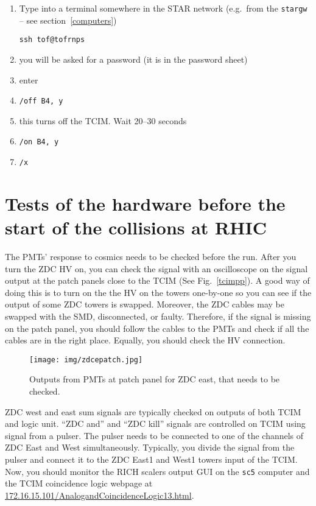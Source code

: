 \begin{enumerate}
\item Type into a terminal somewhere in the STAR network (e.g.\ from the \texttt{stargw} -- see section~\ref{computers})
\begin{verbatim}
ssh tof@tofrnps
\end{verbatim}
\item you will be asked for a password (it is in the password sheet)
\item enter
\item \verb=/off B4, y=
\item this turns off the TCIM. Wait 20--30 seconds
\item \verb=/on B4, y=
\item \verb=/x=
\end{enumerate}

\chapter{Tests of the hardware before the start of the collisions at RHIC}
The PMTs' response to cosmics needs to be checked before the run. After you turn the ZDC HV on, you can check the signal with an oscilloscope on the signal output at the patch panels close to the TCIM (See Fig.\ \ref{tcimpp}). A good way of doing this is to turn on the the HV on the towers one-by-one so you can see if the output of some ZDC towers is swapped.
Moreover, the ZDC cables may be swapped with the SMD, disconnected, or faulty. Therefore, if the signal is missing on the patch panel, you should follow the cables to the PMTs and check if all the cables are in the right place. Equally, you should check the HV connection.

\begin{figure}[htb]
\begin{center}
\texttt{[image: img/zdcepatch.jpg]}
\end{center}
\caption{Outputs from PMTs at patch panel for ZDC east, that needs to be checked.}
\label{zdcepatch}
\end{figure}

ZDC west and east sum signals are typically checked on outputs of both TCIM and logic unit. ``ZDC and'' and ``ZDC kill'' signals are controlled on TCIM using  signal from a pulser. The pulser needs to be connected to one of the channels of ZDC East and West simultaneously. Typically, you divide the signal from the pulser and connect it to the ZDC East1 and West1 towers input of the TCIM. Now, you should monitor the RICH scalers output GUI on the \texttt{sc5} computer and the TCIM coincidence logic webpage at \url{172.16.15.101/AnalogandCoincidenceLogic13.html}.
